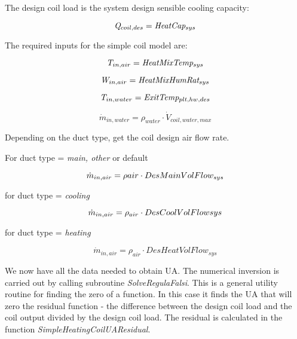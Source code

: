 The design coil load is the system design sensible cooling capacity:

\begin{equation}
\emph{Q\(_{coil,des}\)} = \emph{HeatCap\(_{sys}\)}
\end{equation}

The required inputs for the simple coil model are:

\begin{equation}
\emph{T\(_{in,air}\)} = \emph{HeatMixTemp\(_{sys}\)}
\end{equation}

\begin{equation}
\emph{W\(_{in,air}\)} = \emph{HeatMixHumRat\(_{sys}\)}
\end{equation}

\begin{equation}
\emph{T\(_{in,water}\)} = \emph{ExitTemp\(_{plt,hw,des}\)}
\end{equation}

\begin{equation}
\dot m_{in,water} = \rho_{water} \cdot \dot V_{coil,water,max}
\end{equation}

Depending on the duct type, get the coil design air flow rate.

For duct type = \emph{main, other} or default

\begin{equation}
\emph{\(\dot m_{in,air} = \rho{air} \cdot DesMainVolFlow_{sys}\)}
\end{equation}

for duct type = \emph{cooling}

\begin{equation}
\emph{\(\dot m_{in,air} = \rho_{air} \cdot DesCoolVolFlowsys\)}
\end{equation}

for duct type = \emph{heating}

\begin{equation}
\dot m_{in,air} = \rho_{air} \cdot DesHeatVolFlow_{sys}
\end{equation}

We now have all the data needed to obtain UA. The numerical inversion is carried out by calling subroutine \emph{SolveRegulaFalsi}. This is a general utility routine for finding the zero of a function. In this case it finds the UA that will zero the residual function - the difference between the design coil load and the coil output divided by the design coil load. The residual is calculated in the function \emph{SimpleHeatingCoilUAResidual}.


